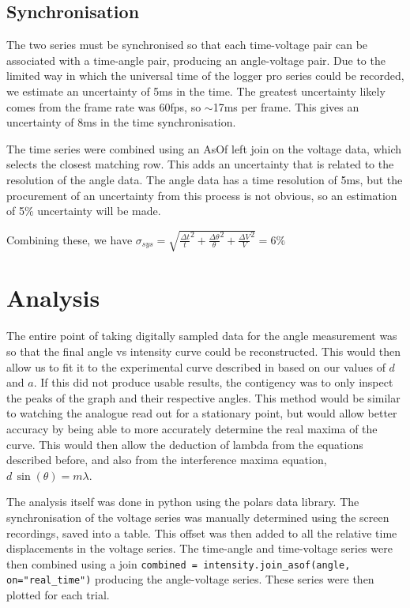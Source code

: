 \subsection*{Synchronisation}

The two series must be synchronised so that each time-voltage pair can be associated with a time-angle pair, producing an angle-voltage pair. Due to the limited way in which the universal time of the logger pro series could be recorded, we estimate an uncertainty of 5ms in the time. The greatest uncertainty likely comes from the frame rate was 60fps, so $\sim$17ms per frame. This gives an uncertainty of 8ms in the time synchronisation.

The time series were combined using an AsOf left join on the voltage data, which selects the closest matching row. This adds an uncertainty that is related to the resolution of the angle data. The angle data has a time resolution of 5ms, but the procurement of an uncertainty from this process is not obvious, so an estimation of 5\% uncertainty will be made.

Combining these, we have $\sigma_{sys} = \sqrt{ \frac{\Delta t}{t}^2 + \frac{\Delta \theta}{\theta}^2 + \frac{\Delta V}{V}^2 } = 6\%$

\section*{Analysis}

The entire point of taking digitally sampled data for the angle measurement was so that the final angle vs intensity curve could be reconstructed. This would then allow us to fit it to the experimental curve described in  based on our values of $d$ and $a$. If this did not produce usable results, the contigency was to only inspect the peaks of the graph and their respective angles. This method would be similar to watching the analogue read out for a stationary point, but would allow better accuracy by being able to more accurately determine the real maxima of the curve. This would then allow the deduction of lambda from the equations described before, and also from the interference maxima equation, $d \, \sin(\theta) = m \lambda$.

The analysis itself was done in python using the polars data library. The synchronisation of the voltage series was manually determined using the screen recordings, saved into a table. 
This offset was then added to all the relative time displacements in the voltage series. The time-angle and time-voltage series were then combined using a join 
\verb|combined = intensity.join_asof(angle, on="real_time")| producing the angle-voltage series. These series were then plotted for each trial.

